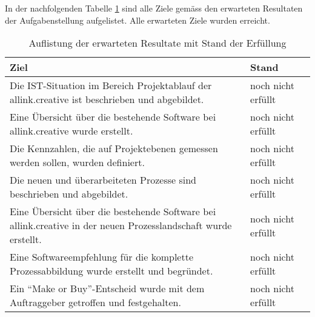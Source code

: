 In der nachfolgenden Tabelle \ref{tab:erreichte_ziele} sind alle Ziele gemäss 
den erwarteten Resultaten der Aufgabenstellung aufgelistet. Alle 
erwarteten Ziele wurden erreicht.

\begin{table}[h]
\begin{center}
    \begin{tabular}{p{11cm}ll}
        \toprule \textbf{Ziel} & \textbf{Stand} \\
        \midrule Die IST-Situation im Bereich Projektablauf der allink.creative
            ist beschrieben und abgebildet. & noch nicht erfüllt \\
        \midrule Eine Übersicht über die bestehende Software bei allink.creative
            wurde erstellt. & noch nicht erfüllt \\
        \midrule Die Kennzahlen, die auf Projektebenen gemessen werden sollen,
            wurden definiert. & noch nicht erfüllt \\
        \midrule Die neuen und überarbeiteten Prozesse sind beschrieben und
            abgebildet. & noch nicht erfüllt \\
        \midrule Eine Übersicht über die bestehende Software bei allink.creative
            in der neuen Prozesslandschaft wurde erstellt. & noch nicht erfüllt \\
        \midrule Eine Softwareempfehlung für die komplette Prozessabbildung
            wurde erstellt und begründet. & noch nicht erfüllt \\
        \midrule Ein ``Make or Buy''-Entscheid wurde mit dem Auftraggeber 
            getroffen und festgehalten. & noch nicht erfüllt \\
        \bottomrule
    \end{tabular}
    \caption{Auflistung der erwarteten Resultate mit Stand der Erfüllung}
    \label{tab:erreichte_ziele}
\end{center}
\end{table}
